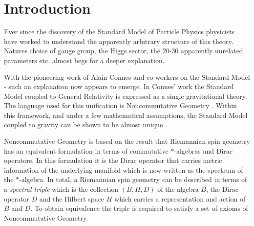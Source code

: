 \documentclass[12pt]{article}
\begin{document}
\newpage
\tableofcontents





































 




\section{Introduction}

Ever since the discovery of the Standard Model of Particle Physics physicists have worked to understand the apparently arbitrary structure of this theory. Natures choice of gauge group, the Higgs sector, the 20-30 apparently unrelated parameters etc. almost begs for a deeper explanation.

With the pioneering work of Alain Connes and co-workers on the Standard Model \cite{ConnesBook}-\cite{Chamseddine:2007ia} such an explanation now appears to emerge. In Connes' work the Standard Model coupled to General Relativity is expressed as a single gravitational theory. 
The language used for this unification is Noncommutative Geometry \cite{ConnesBook}.
Within this framework, and under a few mathematical assumptions, the Standard Model coupled to gravity can be shown to be almost unique \cite{Chamseddine:2007hz,Chamseddine:2007ia}.


Noncommutative Geometry is based on the result \cite{ConnesBook,Rennie:2006pi} that Riemannian spin geometry has an equivalent formulation in terms of commutative $\ast$-algebras and Dirac operators. In this formulation it is the Dirac operator that carries metric information of the underlying manifold which is now written as the spectrum of the $\ast$-algebra. In total, a Riemannian spin geometry can be described in terms of a {\it spectral triple} which is the collection $(B,H,D)$ of the algebra $B$, the Dirac operator $D$ and the Hilbert space $H$ which carries a representation and action of $B$ and $D$. To obtain equivalence the triple is required to satisfy a set of axioms of Noncommutative Geometry.
\end{document}
